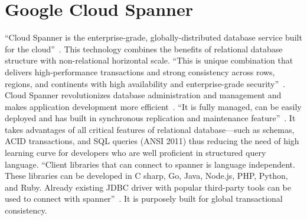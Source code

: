 \section{Google Cloud Spanner}

``Cloud Spanner is the enterprise-grade, globally-distributed database 
service built for the cloud''~\cite{hid-sp18-523-www-google-spanner}. 
This technology combines the benefits of relational database structure 
with non-relational horizontal scale. ``This is unique combination that 
delivers high-performance transactions and strong consistency across rows, 
regions, and continents with high availability and enterprise-grade 
security''~\cite{hid-sp18-523-www-google-spanner}. Cloud Spanner 
revolutionizes database administration and management and makes 
application development more efficient~\cite{hid-sp18-523-www-google-spanner}.
``It is fully managed, can be easily deployed and has built in synchronous 
replication and maintenance feature''~\cite{hid-sp18-523-www-google-spanner}. 
It takes advantages of all critical features of relational database—such 
as schemas, ACID transactions, and SQL queries (ANSI 2011) thus reducing 
the need of high learning curve for developers who are well proficient in 
structured query language. 
``Client libraries that can connect to spanner is language independent. 
These libraries can be developed in C sharp, Go, Java, Node.js, PHP, Python, 
and Ruby. Already existing JDBC driver with popular third-party tools can be 
used to connect with spanner''~\cite{hid-sp18-523-www-google-spanner}. It is 
purposely built for global transactional consistency.
